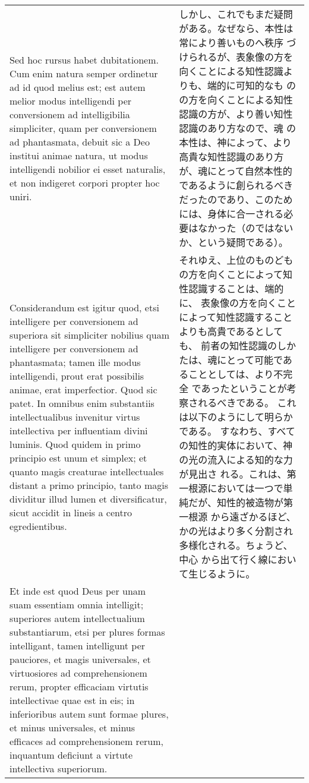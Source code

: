 \documentclass[10pt]{jsarticle} %
\begin{document}
\begin{longtable}{p{21em}p{21em}}
\\

Sed hoc
 rursus habet dubitationem. Cum enim natura semper ordinetur ad id quod
 melius est; est autem melior modus intelligendi per conversionem ad
 intelligibilia simpliciter, quam per conversionem ad phantasmata,
 debuit sic a Deo institui animae natura, ut modus intelligendi nobilior
 ei esset naturalis, et non indigeret corpori propter hoc
 uniri. 

& しかし、これでもまだ疑問がある。なぜなら、本性は常により善いものへ秩序
づけられるが、表象像の方を向くことによる知性認識よりも、端的に可知的なも
のの方を向くことによる知性認識の方が、より善い知性認識のあり方なので、魂
の本性は、神によって、より高貴な知性認識のあり方が、魂にとって自然本性的
であるように創られるべきだったのであり、このためには、身体に合一される必
要はなかった（のではないか、という疑問である）。


\\


Considerandum est igitur quod, etsi intelligere per conversionem
 ad superiora sit simpliciter nobilius quam intelligere per conversionem
 ad phantasmata; tamen ille modus intelligendi, prout erat possibilis
 animae, erat imperfectior. Quod sic patet. In omnibus enim substantiis
 intellectualibus invenitur virtus intellectiva per influentiam divini
 luminis. Quod quidem in primo principio est unum et simplex; et quanto
 magis creaturae intellectuales distant a primo principio, tanto magis
 dividitur illud lumen et diversificatur, sicut accidit in lineis a
 centro egredientibus.

&
それゆえ、上位のものどもの方を向くことによって知性認識することは、端的に、
 表象像の方を向くことによって知性認識することよりも高貴であるとしても、
 前者の知性認識のしかたは、魂にとって可能であることとしては、より不完全
 であったということが考察されるべきである。
これは以下のようにして明らかである。
すなわち、すべての知性的実体において、神の光の流入による知的な力が見出さ
 れる。これは、第一根源においては一つで単純だが、知性的被造物が第一根源
 から遠ざかるほど、かの光はより多く分割され多様化される。ちょうど、中心
 から出て行く線において生じるように。


\\



 Et inde est quod Deus per unam suam essentiam
 omnia intelligit; superiores autem intellectualium substantiarum, etsi
 per plures formas intelligant, tamen intelligunt per pauciores, et
 magis universales, et virtuosiores ad comprehensionem rerum, propter
 efficaciam virtutis intellectivae quae est in eis; in inferioribus
 autem sunt formae plures, et minus universales, et minus efficaces ad
 comprehensionem rerum, inquantum deficiunt a virtute intellectiva
 superiorum.



\end{longtable}
\end{document}
